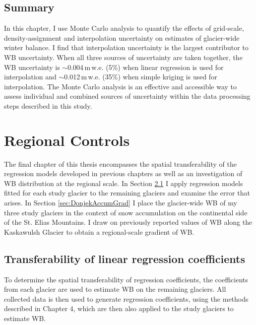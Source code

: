 \documentclass{sfuthesis}
\begin{document}
\section{Summary}

In this chapter, I use Monte Carlo analysis to quantify the effects of grid-scale, density-assignment and interpolation uncertainty on estimates of glacier-wide winter balance. I find that interpolation uncertainty is the largest contributor to WB uncertainty. When all three sources of uncertainty are taken together, the WB uncertainty is $\sim$0.004\,m\,w.e. (5\%) when linear regression is used for interpolation and $\sim$0.012\,m\,w.e. (35\%) when simple kriging is used for interpolation. The Monte Carlo analysis is an effective and accessible way to assess individual and combined sources of uncertainty within the data processing steps described in this study.




\chapter{Regional Controls}
\label{sec:RegionalControls}

The final chapter of this thesis encompasses the spatial transferability of the regression models developed in previous chapters as well as an investigation of WB distribution at the regional scale. In Section \ref{sec:transferability} I apply regression models fitted for each study glacier to the remaining glaciers and examine the error that arises. In Section \ref{sec:DonjekAccumGrad} I place the glacier-wide WB of my three study glaciers in the context of snow accumulation on the continental side of the St. Elias Mountains. I draw on previously reported values of WB along the Kaskawulsh Glacier to obtain a regional-scale gradient of WB.


\section{Transferability of linear regression coefficients}
\label{sec:transferability}

To determine the spatial transferability of regression coefficients, the coefficients from each glacier are used to estimate WB on the remaining glaciers. All collected data is then used to generate regression coefficients, using the methods described in Chapter 4, which are then also applied to the study glaciers to estimate WB. 
\end{document}
